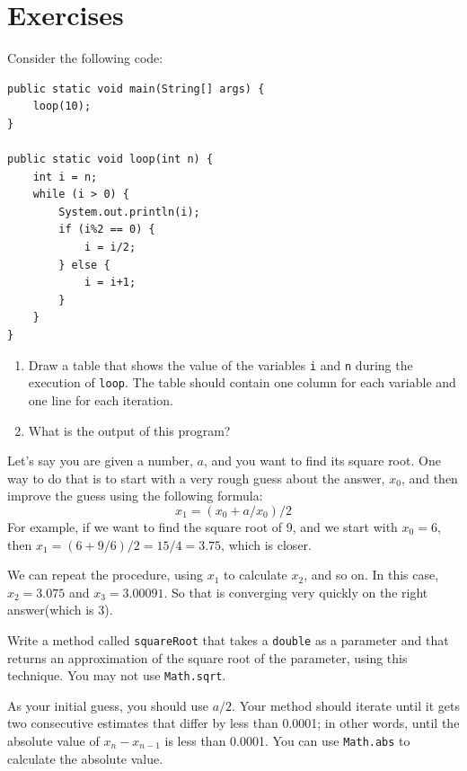 \section{Exercises}

\begin{exercise}
\label{infloop}

Consider the following code:

\begin{lstlisting}
public static void main(String[] args) {
    loop(10);
}

public static void loop(int n) {
    int i = n;
    while (i > 0) {
        System.out.println(i);
        if (i%2 == 0) {
            i = i/2;
        } else {
            i = i+1;
        }
    }
}
\end{lstlisting}
%
\begin{enumerate}

\item Draw a table that shows the value of the variables {\tt i}
and {\tt n} during the execution of {\tt loop}.  The table should
contain one column for each variable and one line for each
iteration.

\item What is the output of this program?

\end{enumerate}
\end{exercise}


\begin{exercise}
Let's say you are given a number, $a$, and you want to find
its square root.  One way to do that is to start with a very
rough guess about the answer, $x_0$, and then improve
the guess using the following formula:
%
\begin{equation*}
x_1 =(x_0 + a/x_0) / 2
\end{equation*}
%
For example, if we want to find the square root of 9, and
we start with $x_0 = 6$, then $x_1 =(6 + 9/6) /2 = 15/4 = 3.75$,
which is closer.

We can repeat the procedure, using $x_1$ to calculate $x_2$,
and so on.  In this case, $x_2 = 3.075$ and $x_3 = 3.00091$.
So that is converging very quickly on the right answer(which
is 3).

Write a method called {\tt squareRoot} that takes a {\tt double}
as a parameter and that returns an approximation of the square
root of the parameter, using this technique.  You may not use
{\tt Math.sqrt}.

As your initial guess, you should use $a/2$.  Your method should
iterate until it gets two consecutive estimates that differ by less
than 0.0001; in other words, until the absolute value of $x_n -
x_{n-1}$ is less than 0.0001.  You can use {\tt Math.abs} to calculate
the absolute value.
\end{exercise}



